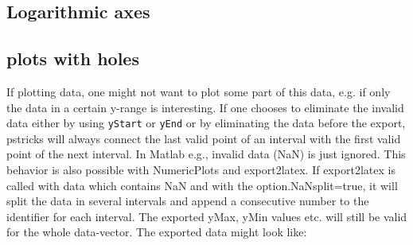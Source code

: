 \begin{minipage}[T]{0.5\linewidth}
	
\end{minipage}
\hspace{1ex}
\begin{minipage}[T]{0.4\linewidth}
	
\end{minipage}



\subsection{Logarithmic axes}


\begin{minipage}[T]{0.5\linewidth}
	
\end{minipage}
\hspace{1ex}
\begin{minipage}[T]{0.4\linewidth}
	
\end{minipage}


\begin{minipage}[T]{0.5\linewidth}
	
\end{minipage}
\hspace{1ex}
\begin{minipage}[T]{0.4\linewidth}
	
\end{minipage}


\begin{minipage}[T]{0.5\linewidth}
	
\end{minipage}
\hspace{1ex}
\begin{minipage}[T]{0.4\linewidth}
	
\end{minipage}


\subsection{plots with holes}

If plotting data, one might not want to plot some part of this data, e.g. if
only the data in a certain y-range is interesting. If one chooses to eliminate the
invalid data either by using \verb+yStart+ or \verb+yEnd+ or by eliminating the
data before the export, pstricks will always connect the last valid point of an
interval with the first valid point of the next interval. In Matlab e.g.,
invalid data (NaN) is just ignored. This behavior is also possible with NumericPlots and
export2latex. If export2latex is called with data which contains NaN and with
the option.NaNsplit=true, it will split the data in several intervals and append
a consecutive number to the identifier for each interval. The exported yMax,
yMin values etc. will still be valid for the whole data-vector. The exported
data might look like:

